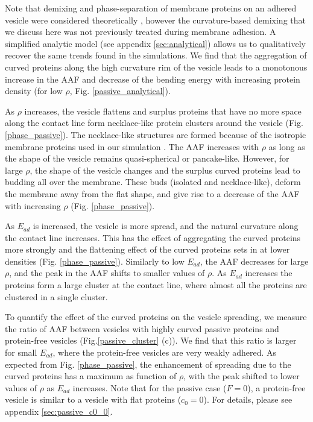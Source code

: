 \documentclass[pre,amsmath]{revtex4}
\begin{document}
Note that demixing and phase-separation of membrane proteins on an adhered vesicle were considered theoretically \cite{rouhiparkouhi2013adhesion}, however the curvature-based demixing \cite{aimon2014membrane} that we discuss here was not previously treated during membrane adhesion. A simplified analytic model (see appendix \ref{sec:analytical}) allows us to qualitatively recover the same trends found in the simulations. We find that the aggregation of curved proteins along the high curvature rim of the vesicle leads to a monotonous increase in the AAF and decrease of the bending energy with increasing protein density (for low $\rho$, Fig. \ref{passive_analytical}).

As $\rho$ increases, the vesicle flattens and surplus proteins that have no more space along the contact line form necklace-like protein clusters around the vesicle (Fig. \ref{phase_passive}). The necklace-like structures are formed because of the isotropic membrane proteins used in our simulation \cite{miha2019,Luka2017}. 
The AAF increases with $\rho$ as long as the shape of the vesicle remains quasi-spherical or pancake-like. However, for large $\rho$, the shape of the vesicle changes and the surplus curved proteins lead to budding all over the membrane. These buds (isolated and necklace-like), deform the membrane away from the flat shape, and give rise to a decrease of the AAF with increasing $\rho$ (Fig. \ref{phase_passive}). 

As $E_{ad}$ is increased, the vesicle is more spread, and the natural curvature along the contact line increases. This has the effect of aggregating the curved proteins more strongly and the flattening effect of the curved proteins sets in at lower densities (Fig. \ref{phase_passive}). Similarly to low $E_{ad}$, the AAF decreases for large $\rho$, and the peak in the AAF shifts to smaller values of $\rho$. As $E_{ad}$ increases the proteins form a large cluster at the contact line, where almost all the proteins are clustered in a single cluster. 


To quantify the effect of the curved proteins on the vesicle spreading, we measure the ratio of AAF between vesicles with highly curved passive proteins and protein-free vesicles (Fig.\ref{passive_cluster} (c)). We find that this ratio is larger for small $E_{ad}$, where the protein-free vesicles are very weakly adhered. As expected from Fig. \ref{phase_passive}, the enhancement of spreading due to the curved proteins has a maximum as function of $\rho$, with the peak shifted to lower values of $\rho$ as $E_{ad}$ increases. Note that for the passive case ($F=0$), a protein-free vesicle is similar to a vesicle with flat proteins ($c_0=0$). For details, please see appendix \ref{sec:passive_c0_0}.
\end{document}
